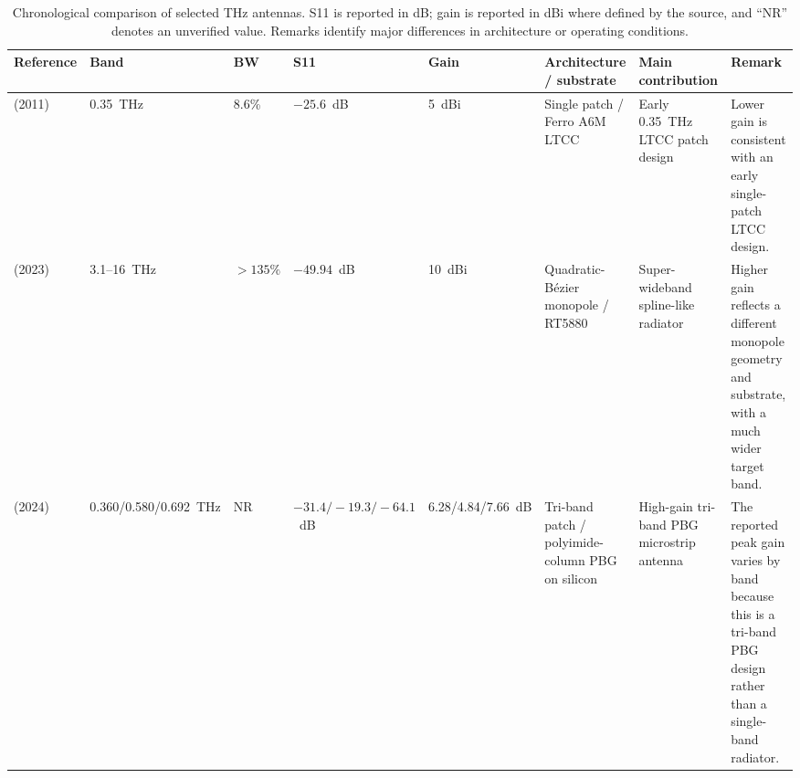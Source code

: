 \documentclass[a4paper,fleqn]{cas-dc}
\begin{document}
\begin{table}[t]
\centering
\scriptsize
\caption{Chronological comparison of selected THz antennas. S11 is reported in dB; gain is reported in dBi where defined by the source, and ``NR'' denotes an unverified value. Remarks identify major differences in architecture or operating conditions.}
\label{tab3}
\renewcommand{\arraystretch}{1.15}
\setlength{\tabcolsep}{3pt}
\begin{tabularx}{\linewidth}{@{}M{2.2cm}C{1.35cm}C{1.1cm}C{1.2cm}C{1.1cm}M{2.0cm}M{2.2cm}M{3.0cm}@{}}
\toprule
\textbf{Reference} & \textbf{Band} & \textbf{BW} & \textbf{S11} & \textbf{Gain} & \textbf{Architecture / substrate} & \textbf{Main contribution} & \textbf{Remark} \\
\midrule
\cite{elnawawy_ltcc_2012} (2011) & 0.35~THz & 8.6\% & $-25.6$~dB & 5~dBi & Single patch / Ferro A6M LTCC & Early 0.35~THz LTCC patch design & Lower gain is consistent with an early single-patch LTCC design. \\
\cite{marouf_bezier_2023} (2023) & 3.1--16~THz & $>135\%$ & $-49.94$~dB & 10~dBi & Quadratic-Bézier monopole / RT5880 & Super-wideband spline-like radiator & Higher gain reflects a different monopole geometry and substrate, with a much wider target band. \\
\cite{li_triband_2024} (2024) & 0.360/0.580/0.692~THz & NR & $-31.4/-19.3/-64.1$~dB & 6.28/4.84/7.66~dB & Tri-band patch / polyimide-column PBG on silicon & High-gain tri-band PBG microstrip antenna & The reported peak gain varies by band because this is a tri-band PBG design rather than a single-band radiator. \\


\end{tabularx}
\end{table}
\end{document}
